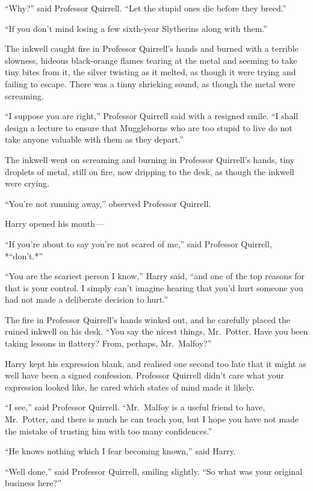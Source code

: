 ``Why?'' said Professor Quirrell. ``Let the stupid ones die before they
breed.''

``If you don't mind losing a few sixth-year Slytherins along with
them.''

The inkwell caught fire in Professor Quirrell's hands and burned with a
terrible slowness, hideous black-orange flames tearing at the metal and
seeming to take tiny bites from it, the silver twisting as it melted, as
though it were trying and failing to escape. There was a tinny shrieking
sound, as though the metal were screaming.

``I suppose you are right,'' Professor Quirrell said with a resigned
smile. ``I shall design a lecture to ensure that Muggleborns who are too
stupid to live do not take anyone valuable with them as they depart.''

The inkwell went on screaming and burning in Professor Quirrell's hands,
tiny droplets of metal, still on fire, now dripping to the desk, as
though the inkwell were crying.

``You're not running away,'' observed Professor Quirrell.

Harry opened his mouth---

``If you're about to say you're not scared of me,'' said Professor
Quirrell, *``don't.*''

``You are the scariest person I know,'' Harry said, ``and one of the top
reasons for that is your control. I simply can't imagine hearing that
you'd hurt someone you had not made a deliberate decision to hurt.''

The fire in Professor Quirrell's hands winked out, and he carefully
placed the ruined inkwell on his desk. ``You say the nicest things,
Mr.~Potter. Have you been taking lessons in flattery? From, perhaps,
Mr.~Malfoy?''

Harry kept his expression blank, and realised one second too late that
it might as well have been a signed confession. Professor Quirrell
didn't care what your expression looked like, he cared which states of
mind made it likely.

``I see,'' said Professor Quirrell. ``Mr.~Malfoy is a useful friend to
have, Mr.~Potter, and there is much he can teach you, but I hope you
have not made the mistake of trusting him with too many confidences.''

``He knows nothing which I fear becoming known,'' said Harry.

``Well done,'' said Professor Quirrell, smiling slightly. ``So what was
your original business here?''

